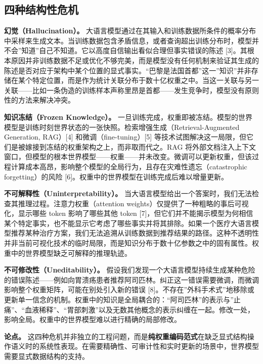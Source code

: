 \documentclass[11pt,a4paper]{ctexart}
\begin{document}
\subsection{四种结构性危机}\label{ux56dbux79cdux7ed3ux6784ux6027ux5371ux673a}

\textbf{幻觉（Hallucination）。}
大语言模型通过在其输入和训练数据所条件的概率分布中采样来生成文本。当训练数据包含矛盾信息，或者查询超出训练分布时，模型并不会''知道''自己不知道。它以高度自信输出看似合理但事实错误的陈述
{[}3{]}。其根本原因并非训练数据不足或优化不够完美，而是模型没有任何机制来验证其生成的陈述是否对应于架构中某个位置的显式事实。``巴黎是法国首都''这一''知识''并非存储在某个特定位置，而是作为统计关联分布于数十亿权重之中。当这一关联与另一关联------比如一条伪造的训练样本声称里昂是首都------发生竞争时，模型没有原则性的方法来解决冲突。

\textbf{知识冻结（Frozen Knowledge）。}
一旦训练完成，权重即被冻结。模型的世界模型是训练时刻世界状态的一张快照。检索增强生成（Retrieval-Augmented
Generation, RAG）{[}4{]} 和微调（fine-tuning）{[}5{]}
等技术试图解决这一局限，但它们是被嫁接到冻结的权重架构之上，而非取而代之。RAG
将外部文档注入上下文窗口，但模型的根本世界模型------权重------并未改变。微调可以更新权重，但该过程计算成本高昂，影响整个模型的全局行为，且存在灾难性遗忘（catastrophic
forgetting）的风险 {[}6{]}。权重中的世界模型在训练完成后难以增量更新。

\textbf{不可解释性（Uninterpretability）。}
当大语言模型给出一个答案时，我们无法检查其推理过程。注意力权重（attention
weights）仅提供了一种粗略的事后可视化，显示哪些 token 影响了哪些其他
token
{[}7{]}，但它们并不能揭示模型为何相信某个特定事实，也不能显示它考虑了哪些事实并将其排除。如果一个医疗大语言模型推荐某种治疗方案，我们无法追溯从训练数据到推荐结果的路径。这种不透明性并非当前可视化技术的临时局限，而是知识分布于数十亿参数之中的固有属性。权重中的世界模型缺乏可解释的推理轨迹。

\textbf{不可修改性（Uneditability）。}
假设我们发现一个大语言模型持续生成某种危险的错误陈述------例如向胃溃疡患者推荐阿司匹林。纠正这一错误需要微调，而微调影响整个权重矩阵，可能在别处引入新的错误
{[}8{]}。不存在''外科手术式''地移除或更新单一信念的机制。权重中的知识是全局耦合的：``阿司匹林''的表示与''止痛''、``血液稀释''、``胃部刺激''以及无数其他概念的表示纠缠在一起。修改一处，影响全局。权重中的世界模型难以进行精确的局部修改。

\textbf{论点。}
这四种危机并非独立的工程问题，而是\textbf{纯权重编码范式}在缺乏显式结构操作语义时的系统性表现。在需要精确性、可审计性和实时更新的场景中，世界模型需要显式数据结构的支持。
\end{document}
